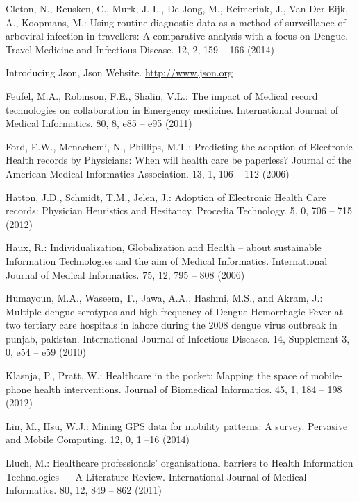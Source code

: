 \documentclass[runningheads,a4paper]{llncs}
\begin{document}
\begin{thebibliography}{4}
 Cleton, N., Reusken, C., Murk, J.-L., De Jong, M., Reimerink, J., Van Der Eijk, A., Koopmans, M.:
Using routine diagnostic data as a method of surveillance of arboviral infection in travellers: A comparative analysis with a focus on Dengue.
Travel Medicine and Infectious Disease. 12, 2, 159 -- 166 (2014)

 Introducing Json, Json Website. \url{http://www.json.org}

 Feufel, M.A., Robinson, F.E., Shalin, V.L.:
The impact of Medical record technologies on collaboration in Emergency medicine.
International Journal of Medical Informatics. 80, 8, e85 -- e95 (2011)

 Ford, E.W., Menachemi, N., Phillips, M.T.:
Predicting the adoption of Electronic Health records by Physicians: When will health care be paperless?
Journal of the American Medical Informatics Association. 13, 1, 106 -- 112 (2006)

 Hatton, J.D., Schmidt, T.M., Jelen, J.:
Adoption of Electronic Health Care records: Physician Heuristics and Hesitancy.
Procedia Technology. 5, 0, 706 -- 715 (2012)

 Haux, R.:
Individualization, Globalization and Health – about sustainable Information Technologies and the aim of Medical Informatics.
International Journal of Medical Informatics. 75, 12, 795 -- 808 (2006)

 Humayoun, M.A., Waseem, T., Jawa, A.A., Hashmi, M.S., and Akram, J.:
Multiple dengue serotypes and high frequency of Dengue Hemorrhagic Fever at two tertiary care hospitals in lahore during the 2008 dengue virus outbreak in punjab, pakistan.
International Journal of Infectious Diseases. 14, Supplement 3, 0, e54 -- e59 (2010)

 Klasnja, P., Pratt, W.:
Healthcare in the pocket: Mapping the space of mobile-phone health interventions.
Journal of Biomedical Informatics. 45, 1, 184 -- 198 (2012)

 Lin, M., Hsu, W.J.:
Mining GPS data for mobility patterns: A survey.
Pervasive and Mobile Computing. 12, 0, 1 --16 (2014)

 Lluch, M.:
Healthcare professionals’ organisational barriers to Health Information Technologies — A Literature Review.
International Journal of Medical Informatics. 80, 12, 849 -- 862 (2011)


\end{thebibliography}
\end{document}
